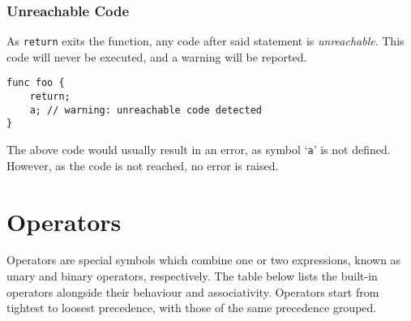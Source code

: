 \documentclass{article}
\begin{document}
    \subsubsection{Unreachable Code}

    As \texttt{return} exits the function, any code after said statement is \textit{unreachable}.
    This code will never be executed, and a warning will be reported.

    \begin{lstlisting}[language=CustomLang]
func foo {
    return;
    a; // warning: unreachable code detected
}
    \end{lstlisting}

    The above code would usually result in an error, as symbol `\texttt{a}' is not defined.
    However, as the code is not reached, no error is raised.

    \section{Operators}

    Operators are special symbols which combine one or two expressions, known as unary and binary operators, respectively.
    The table below lists the built-in operators alongside their behaviour and associativity.
    Operators start from tightest to loosest precedence, with those of the same precedence grouped.
\end{document}
